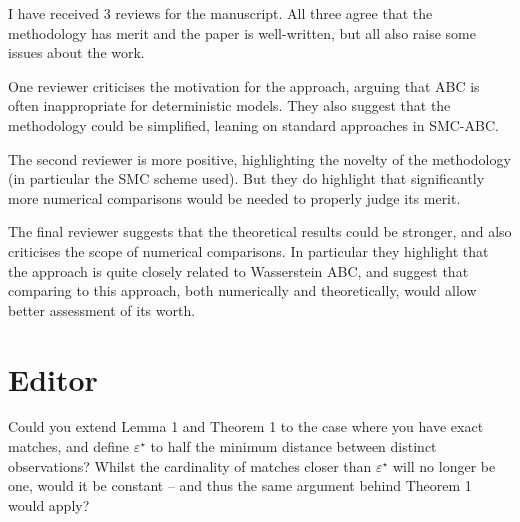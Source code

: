 \documentclass[10.5pt]{article}
\begin{document}
I have received 3 reviews for the manuscript. All three agree that the methodology has merit and the paper is well-written, but all also raise some issues about the work. 

One reviewer criticises the motivation for the approach, arguing that ABC is often inappropriate for deterministic models. They also suggest that the methodology could be simplified, leaning on standard approaches in SMC-ABC. 

The second reviewer is more positive, highlighting the novelty of the methodology (in particular the SMC scheme used).  But they do highlight that significantly more numerical comparisons would be needed to properly judge its merit. 

The final reviewer suggests that the theoretical results could be stronger, and also criticises the scope of  numerical comparisons.  In particular they highlight that the approach is quite closely related to Wasserstein ABC, and suggest that comparing to this approach, both numerically and theoretically, would allow better assessment of its worth. 

\section*{Editor}

Could you extend Lemma 1 and Theorem 1 to the case where you have exact matches, and define $\varepsilon^{\star}$ to half the minimum distance between distinct observations? Whilst the cardinality of matches closer than $\varepsilon^{\star}$ will no longer be one, would it be constant -- and thus the same argument behind Theorem 1 would apply?
\end{document}
